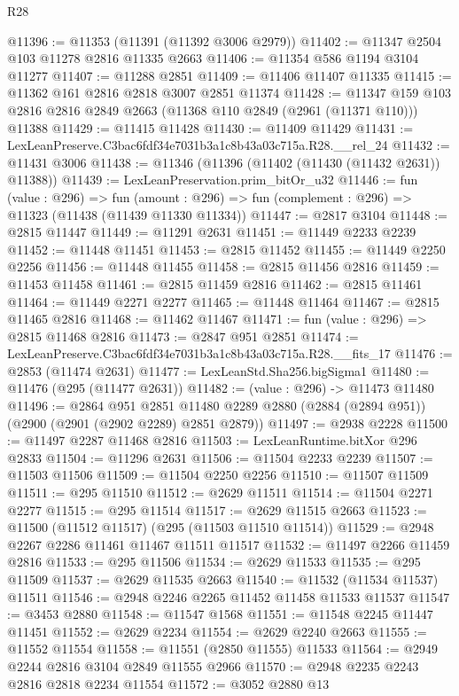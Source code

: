 \begin{lexlean}{R28}
\begin{coremodule}
@11396 := @11353 (@11391 (@11392 @3006 @2979))
@11402 := @11347 @2504 @103 @11278 @2816 @11335 @2663
@11406 := @11354 @586 @1194 @3104 @11277
@11407 := @11288 @2851
@11409 := @11406 @11407 @11335
@11415 := @11362 @161 @2816 @2818 @3007 @2851 @11374
@11428 := @11347 @159 @103 @2816 @2816 @2849 @2663 (@11368 @110 @2849 (@2961 (@11371 @110))) @11388
@11429 := @11415 @11428
@11430 := @11409 @11429
@11431 := LexLeanPreserve.C3bac6fdf34e7031b3a1c8b43a03c715a.R28.__rel_24
@11432 := @11431 @3006
@11438 := @11346 (@11396 (@11402 (@11430 (@11432 @2631)) @11388))
@11439 := LexLeanPreservation.prim_bitOr_u32
@11446 := fun (value : @296) =>
  fun (amount : @296) => fun (complement : @296) => @11323 (@11438 (@11439 @11330 @11334))
@11447 := @2817 @3104
@11448 := @2815 @11447
@11449 := @11291 @2631
@11451 := @11449 @2233 @2239
@11452 := @11448 @11451
@11453 := @2815 @11452
@11455 := @11449 @2250 @2256
@11456 := @11448 @11455
@11458 := @2815 @11456 @2816
@11459 := @11453 @11458
@11461 := @2815 @11459 @2816
@11462 := @2815 @11461
@11464 := @11449 @2271 @2277
@11465 := @11448 @11464
@11467 := @2815 @11465 @2816
@11468 := @11462 @11467
@11471 := fun (value : @296) => @2815 @11468 @2816
@11473 := @2847 @951 @2851
@11474 := LexLeanPreserve.C3bac6fdf34e7031b3a1c8b43a03c715a.R28.__fits_17
@11476 := @2853 (@11474 @2631)
@11477 := LexLeanStd.Sha256.bigSigma1
@11480 := @11476 (@295 (@11477 @2631))
@11482 := (value : @296) -> @11473 @11480
@11496 := @2864
    @951
    @2851
    @11480
    @2289
    @2880
    (@2884 (@2894 @951))
    (@2900 (@2901 (@2902 @2289) @2851 @2879))
@11497 := @2938 @2228
@11500 := @11497 @2287 @11468 @2816
@11503 := LexLeanRuntime.bitXor @296 @2833
@11504 := @11296 @2631
@11506 := @11504 @2233 @2239
@11507 := @11503 @11506
@11509 := @11504 @2250 @2256
@11510 := @11507 @11509
@11511 := @295 @11510
@11512 := @2629 @11511
@11514 := @11504 @2271 @2277
@11515 := @295 @11514
@11517 := @2629 @11515 @2663
@11523 := @11500 (@11512 @11517) (@295 (@11503 @11510 @11514))
@11529 := @2948 @2267 @2286 @11461 @11467 @11511 @11517
@11532 := @11497 @2266 @11459 @2816
@11533 := @295 @11506
@11534 := @2629 @11533
@11535 := @295 @11509
@11537 := @2629 @11535 @2663
@11540 := @11532 (@11534 @11537) @11511
@11546 := @2948 @2246 @2265 @11452 @11458 @11533 @11537
@11547 := @3453 @2880
@11548 := @11547 @1568
@11551 := @11548 @2245 @11447 @11451
@11552 := @2629 @2234
@11554 := @2629 @2240 @2663
@11555 := @11552 @11554
@11558 := @11551 (@2850 @11555) @11533
@11564 := @2949 @2244 @2816 @3104 @2849 @11555 @2966
@11570 := @2948 @2235 @2243 @2816 @2818 @2234 @11554
@11572 := @3052 @2880 @13

\end{coremodule}
\end{lexlean}
